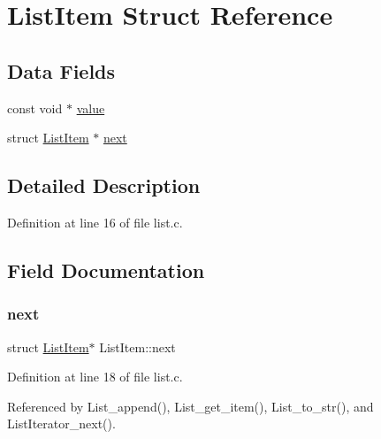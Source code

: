 \hypertarget{structListItem}{}\section{List\+Item Struct Reference}
\label{structListItem}
\subsection*{Data Fields}
\begin{DoxyCompactItemize}
\item 
const void $\ast$ \mbox{\hyperlink{structListItem_a4726bec30855b9d9776368f3b6fad191}{value}}
\item 
struct \mbox{\hyperlink{structListItem}{List\+Item}} $\ast$ \mbox{\hyperlink{structListItem_a3a9c06ae85f60557666cb569b36072a9}{next}}
\end{DoxyCompactItemize}


\subsection{Detailed Description}


Definition at line 16 of file list.\+c.



\subsection{Field Documentation}
\mbox{\label{structListItem_a3a9c06ae85f60557666cb569b36072a9}} 
\subsubsection{\texorpdfstring{next}{next}}
{\footnotesize\ttfamily struct \mbox{\hyperlink{structListItem}{List\+Item}}$\ast$ List\+Item\+::next}



Definition at line 18 of file list.\+c.



Referenced by List\+\_\+append(), List\+\_\+get\+\_\+item(), List\+\_\+to\+\_\+str(), and List\+Iterator\+\_\+next().

\mbox{\label{structListItem_a4726bec30855b9d9776368f3b6fad191}} 
